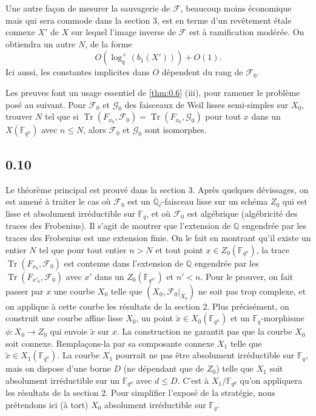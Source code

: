 \documentclass[10pt,a4paper]{article}
\theoremstyle{plain}
\theoremstyle{definition}
\DeclareMathOperator{\tr}{Tr}
\begin{document}
Une autre fa\c{c}on de mesurer la sauvagerie de $\mathcal{F}$, beaucoup moins \'economique mais qui sera commode dans la section 3, est en terme d'un rev\^etement \'etale connexe $X'$ de $X$ sur lequel l'image inverse de $\mathcal{F}$ est \`a ramification mod\'er\'ee. On obtiendra un autre $N$, de la forme
\begin{equation}\label{eq:0.9.2}
O(\log_q^+(b_1(X'))) + O(1).
\end{equation}
Ici aussi, les constantes implicites dans $O$ d\'ependent du rang de $\mathcal{F}_0$.

Les preuves font un usage essentiel de \ref{thm:0.6} (iii), pour ramener le probl\`eme pos\'e au suivant. Pour $\mathcal{F}_0$ et $\mathcal{G}_0$ des faisceaux de Weil lisses semi-simples sur $X_0$, trouver $N$ tel que si $\tr(F_{x_0},\mathcal{F}_0) = \tr(F_{x_0},\mathcal{G}_0)$ pour tout $x$ dans un $X(\mathbb{F}_{q^n})$ avec $n \leq N$, alors $\mathcal{F}_0$ et $\mathcal{G}_0$ sont isomorphes.

\subsection*{0.10}

Le th\'eor\`eme principal est prouv\'e dans la section 3. Apr\`es quelques d\'evissages, on est amen\'e \`a traiter le cas o\`u $\mathcal{F}_0$ est un $\overline{\mathbb{Q}}_\ell$-faisceau lisse sur un sch\'ema $Z_0$ qui est lisse et absolument irr\'eductible sur $\mathbb{F}_q$, et o\`u $\mathcal{F}_0$ est alg\'ebrique (alg\'ebricit\'e des traces des Frobenius). Il s'agit de montrer que l'extension de $\mathbb{Q}$ engendr\'ee par les traces des Frobenius est une extension finie. On le fait en montrant qu'il existe un entier $N$ tel que pour tout entier $n > N$ et tout point $x \in Z_0(\mathbb{F}_{q^n})$, la trace $\tr(F_{x_0}, \mathcal{F}_0)$ est contenue dans l'extension de $\mathbb{Q}$ engendr\'ee par les $\tr(F_{x'_0}, \mathcal{F}_0)$ avec $x'$ dans un $Z_0(\mathbb{F}_{q^{n'}})$ et $n' < n$. Pour le prouver, on fait passer par $x$ une courbe $X_0$ telle que $(X_0, \mathcal{F}_0|_{X_0})$ ne soit pas trop complexe, et on applique \`a cette courbe les r\'esultats de la section 2. Plus pr\'ecis\'ement, on construit une courbe affine lisse $X_0$, un point $\tilde{x} \in X_0(\mathbb{F}_{q^n})$ et un $\mathbb{F}_q$-morphisme $\phi: X_0 \to Z_0$ qui envoie $\tilde{x}$ sur $x$. La construction ne garantit pas que la courbe $X_0$ soit connexe. Rempla\c{c}ons-la par sa composante connexe $X_1$ telle que $\tilde{x} \in X_1(\mathbb{F}_{q^n})$. La courbe $X_1$ pourrait ne pas \^etre absolument irr\'eductible sur $\mathbb{F}_q$, mais on dispose d'une borne $D$ (ne d\'ependant que de $Z_0$) telle que $X_1$ soit absolument irr\'eductible sur un $\mathbb{F}_{q^d}$ avec $d \leq D$. C'est \`a $X_1/\mathbb{F}_{q^d}$ qu'on appliquera les r\'esultats de la section 2. Pour simplifier l'expos\'e de la strat\'egie, nous pr\'etendons ici (\`a tort) $X_0$ absolument irr\'eductible sur $\mathbb{F}_q$.
\end{document}
